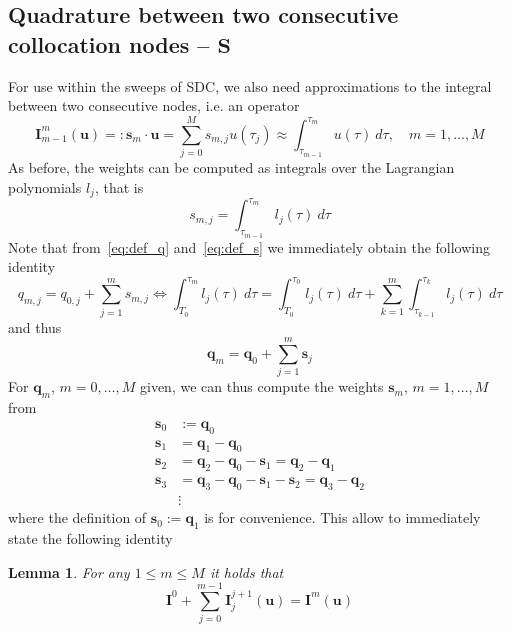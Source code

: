 \documentclass[11pt]{article}
\newcommand{\Tt}[1]{\mathbf{#1}}
\newtheorem{lemma}{Lemma}
\begin{document}
\subsection{Quadrature between two consecutive collocation nodes -- $\Tt{S}$}
For use within the sweeps of SDC, we also need approximations to the integral between two consecutive nodes, i.e. an operator
\begin{equation}
	\Tt{I}_{m-1}^{m}(\Tt{u}) =: \Tt{s}_{m} \cdot \Tt{u} = \sum_{j=0}^{M} s_{m,j} u(\tau_j) \approx \int_{\tau_{m-1}}^{\tau_{m}} u(\tau) \ d\tau, \quad m=1,\ldots,M
\end{equation}
As before, the weights can be computed as integrals over the Lagrangian polynomials $l_j$, that is
\begin{equation}
	\label{eq:def_s}
	s_{m, j} = \int_{\tau_{m-1}}^{\tau_{m}} l_{j}(\tau) \ d\tau
\end{equation}
Note that from~\eqref{eq:def_q} and~\eqref{eq:def_s} we immediately obtain the following identity 
\begin{equation}
	q_{m, j} =  q_{0, j} + \sum_{j=1}^{m} s_{m,j} \Leftrightarrow \int_{T_0}^{\tau_{m}} l_j(\tau) \ d\tau = \int_{T_0}^{\tau_{0}} l_{j}(\tau) \ d\tau + \sum_{k=1}^{m} \int_{\tau_{k-1}}^{\tau_{k}} l_j(\tau)\ d\tau
\end{equation}
and thus
\begin{equation}
	\Tt{q}_{m} = \Tt{q}_{0} + \sum_{j=1}^{m} \Tt{s}_{j}
\end{equation}
For $\Tt{q}_{m}$, $m=0,\ldots, M$ given, we can thus compute the weights $\Tt{s}_{m}$, $m=1,\ldots,M$ from
\begin{align}
	\Tt{s}_{0} &:= \Tt{q}_{0} \\
	\Tt{s}_{1} &= \Tt{q}_{1} - \Tt{q}_{0} \\
	\Tt{s}_{2} &= \Tt{q}_{2} - \Tt{q}_{0} - \Tt{s}_{1} = \Tt{q}_{2} - \Tt{q}_{1} \\
	\Tt{s}_{3} &= \Tt{q}_{3} - \Tt{q}_{0} - \Tt{s}_{1} - \Tt{s}_{2} = \Tt{q}_{3} - \Tt{q}_{2} \\
	 	&\vdots
\end{align}
where the definition of $\Tt{s}_{0} := \Tt{q}_{1}$ is for convenience. This allow to immediately state the following identity
\begin{lemma}\label{lemma:Isummed}
For any $1 \leq m \leq M$ it holds that
\begin{equation}
	\Tt{I}^{0} + \sum_{j=0}^{m-1} \Tt{I}_{j}^{j+1}(\Tt{u}) = \Tt{I}^{m}(\Tt{u})
\end{equation}
\end{lemma}
\end{document}
